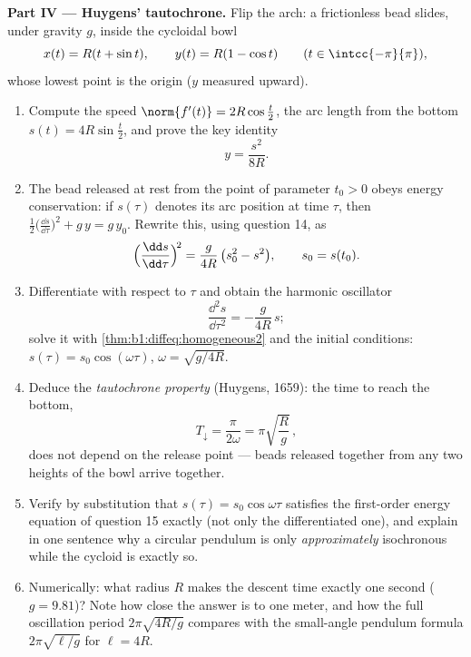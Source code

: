 \begin{problem}
\medskip
\noindent\textbf{Part IV --- Huygens' tautochrone.} Flip the
arch: a frictionless bead slides, under gravity $g$, inside the
cycloidal bowl
\[
x(t) = R(t + \sin t), \qquad y(t) = R(1 - \cos t)
\qquad (t \in \intcc{-\pi}{\pi}),
\]
whose lowest point is the origin ($y$ measured upward).
\begin{enumerate}[resume]
  \item Compute the speed $\norm{f'(t)} = 2R\cos\frac t2$, the
        arc length from the bottom $s(t) = 4R\sin\frac t2$, and
        prove the key identity
        \[
        y = \frac{s^2}{8R} .
        \]
  \item The bead released at rest from the point of parameter
        $t_0 > 0$ obeys energy conservation: if $s(\tau)$ denotes
        its arc position at time $\tau$, then $\frac12\bigl(
        \frac{\dd s}{\dd\tau}\bigr)^2 + g\,y = g\,y_0$. Rewrite
        this, using question 14, as
        \[
        \Bigl(\frac{\dd s}{\dd\tau}\Bigr)^{\!2}
        = \frac{g}{4R}\,\bigl(s_0^2 - s^2\bigr),
        \qquad s_0 = s(t_0).
        \]
  \item Differentiate with respect to $\tau$ and obtain the
        harmonic oscillator
        \[
        \frac{\dd^2 s}{\dd\tau^2} = -\frac{g}{4R}\,s ;
        \]
        solve it with \cref{thm:b1:diffeq:homogeneous2} and the
        initial conditions: $s(\tau) = s_0\cos(\omega\tau)$,
        $\omega = \sqrt{g/4R}$.
  \item Deduce the \emph{tautochrone property} (Huygens, 1659):
        the time to reach the bottom,
        \[
        T_{\downarrow} = \frac{\pi}{2\omega}
        = \pi\sqrt{\frac Rg}\,,
        \]
        does not depend on the release point --- beads released
        together from any two heights of the bowl arrive
        together.
  \item Verify by substitution that $s(\tau) =
        s_0\cos\omega\tau$ satisfies the first-order energy
        equation of question 15 exactly (not only the
        differentiated one), and explain in one sentence why a
        circular pendulum is only \emph{approximately}
        isochronous while the cycloid is exactly so.
  \item Numerically: what radius $R$ makes the descent time
        exactly one second ($g = 9.81$)? Note how close the
        answer is to one meter, and how the full oscillation
        period $2\pi\sqrt{4R/g}$ compares with the small-angle
        pendulum formula $2\pi\sqrt{\ell/g}$ for $\ell = 4R$.
\end{enumerate}


\end{problem}
